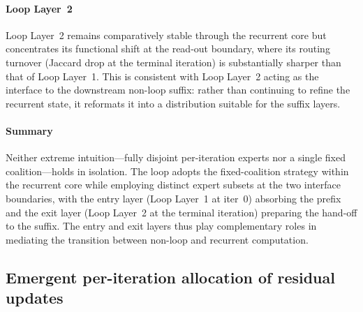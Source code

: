 \paragraph{Loop Layer~2} 
Loop Layer~2 remains comparatively stable through the recurrent core but concentrates its functional shift at the read-out boundary, where its routing turnover (Jaccard drop at the terminal iteration) is substantially sharper than that of Loop Layer~1. This is consistent with Loop Layer~2 acting as the interface to the downstream non-loop suffix: rather than continuing to refine the recurrent state, it reformats it into a distribution suitable for the suffix layers.

\paragraph{Summary} 
Neither extreme intuition---fully disjoint per-iteration experts nor a single fixed coalition---holds in isolation. The loop adopts the fixed-coalition strategy within the recurrent core while employing distinct expert subsets at the two interface boundaries, with the entry layer (Loop Layer~1 at iter~0) absorbing the prefix and the exit layer (Loop Layer~2 at the terminal iteration) preparing the hand-off to the suffix. The entry and exit layers thus play complementary roles in mediating the transition between non-loop and recurrent computation.


\subsection{Emergent per-iteration allocation of residual updates}
\label{app:loop-alpha-schedule}

